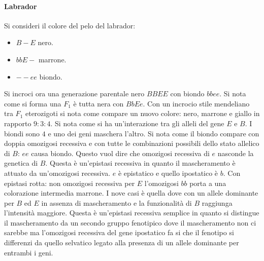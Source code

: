 \paragraph{Labrador}
Si consideri il colore del pelo del labrador: 
\begin{itemize}
	\item $B-E$ nero.
	\item $bbE-$ marrone.
	\item $--ee$ biondo.
\end{itemize}
Si incroci ora una generazione parentale nero $BBEE$ con biondo $bbee$. Si nota come si forma una $F_1$ \`e tutta nera con $BbEe$. Con un incrocio stile mendeliano tra $F_1$ eterozigoti
si nota come compare un nuovo colore: nero, marrone e giallo in rapporto $9:3:4$. Si nota come si ha un'interazione tra gli alleli del gene $E$ e $B$. I biondi sono $4$ e uno dei 
geni maschera l'altro. Si nota come il biondo compare con doppia omozigosi recessiva e con tutte le combinazioni possibili dello stato allelico di $B$: $ee$ causa biondo. Questo vuol
dire che omozigosi recessiva di $e$ nasconde la genetica di $B$. Questa \`e un'epistasi recessiva in quanto il mascheramento \`e attuato da un'omozigosi recessiva. $e$ \`e epistatico 
e quello ipostatico \`e $b$. Con epistasi rotta: non omozigosi recessiva per $E$ l'omozigosi $bb$ porta a una colorazione intermedia marrone. I nove casi \`e quella dove con un 
allele dominante per $B$ ed $E$ in assenza di mascheramento e la funzionalit\`a di $B$ raggiunga l'intensit\`a maggiore. Questa \`e un'epistasi recessiva semplice in quanto si 
distingue il mascheramento da un secondo gruppo fenotipico dove il mascheramento non ci sarebbe ma l'omozigosi recessiva del gene ipostatico fa si che il fenotipo si differenzi da quello
selvatico legato alla presenza di un allele dominante per entrambi i geni.
